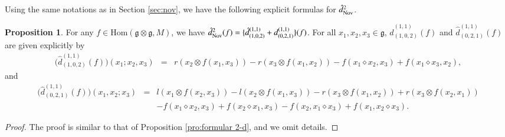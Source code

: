\documentclass[12pt]{amsart}
\theoremstyle{definition}
\newtheorem{pro}[thm]{Proposition}
\newcommand{\g}{\mathfrak g}
\newcommand{\Hom}{\mathrm{Hom}}
\newcommand{\ot}{\otimes}
\newcommand{\nov}{{\rm Nov}}
\begin{document}
Using the same notations as in Section \ref{sec:nov}, we have the following explicit formulas for $\hat{d}_{\nov}^2$.
\begin{pro}\label{ex:coeff-2-d}
	For any $ f\in \Hom(\g\ot\g,M)$, we have $\hat{d}_{\nov}^2( f)= \{\hat{d}_{(1,0,2)}^{(1,1)}+d_{(0,2,1)}^{(1,1)}\}( f)$. For all $x_1,x_2,x_3\in \g$, $\hat{d}_{(1,0,2)}^{(1,1)}( f)$ and $\hat{d}_{(0,2,1)}^{(1,1)}( f)$ are given explicitly by
	\begin{eqnarray*}
		\big( \hat{d}_{(1,0,2)}^{(1,1)}( f)\big)(x_1;x_2,x_3)
		&=&r(x_2\ot f(x_1,x_3))-r(x_3\ot f(x_1,x_2))-f(x_1\diamond x_2,x_3)+f(x_1\diamond x_3,x_2),
	\end{eqnarray*}
	and
	\begin{eqnarray*}
		\big(\hat{d}_{(0,2,1)}^{(1,1)}( f)\big)(x_1,x_2;x_3)
		&=&l(x_1\ot f(x_2,x_3))-l(x_2\ot f(x_1,x_3))-r(x_3\ot f(x_1,x_2))+r(x_3\ot f(x_2,x_1))\\
		&&- f(x_1\diamond x_2,x_3)+ f(x_2\diamond x_1,x_3)- f(x_2,x_1\diamond x_3)+ f(x_1,x_2\diamond x_3).
	\end{eqnarray*}
\end{pro}
\begin{proof}
The proof is similar to that of Proposition \ref{pro:formular 2-d}, and we omit details.
\end{proof}
\end{document}
